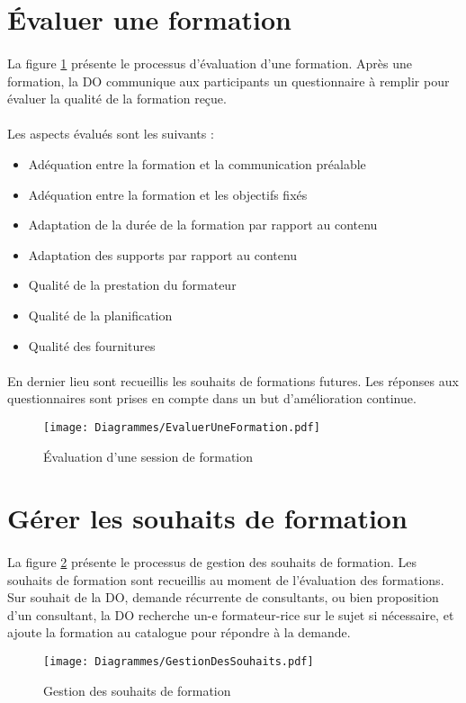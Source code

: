 \section{Évaluer une formation}
\label{sec:eval}
\paragraph{} La figure \ref{evalFormation} présente le processus d'évaluation d'une formation. Après une formation, la DO communique aux participants un questionnaire à remplir pour évaluer la qualité de la formation reçue.
\paragraph{} Les aspects évalués sont les suivants :
\begin{itemize}
	\item Adéquation entre la formation et la communication préalable
	\item Adéquation entre la formation et les objectifs fixés
	\item Adaptation de la durée de la formation par rapport au contenu
	\item Adaptation des supports par rapport au contenu
	\item Qualité de la prestation du formateur
	\item Qualité de la planification
	\item Qualité des fournitures
\end{itemize}

\paragraph{} En dernier lieu sont recueillis les souhaits de formations futures. Les réponses aux questionnaires sont prises en compte dans un but d'amélioration continue.


\begin{figure}[H]
\centering
	\begin{sideways}
		\texttt{[image: Diagrammes/EvaluerUneFormation.pdf]}
	\end{sideways}
	\caption{Évaluation d'une session de formation}
	\label{evalFormation}
\end{figure}


\section{Gérer les souhaits de formation}
\paragraph{} La figure \ref{souhaits} présente le processus de gestion des souhaits de formation. Les souhaits de formation sont recueillis au moment de l'évaluation des formations. Sur souhait de la DO, demande récurrente de consultants, ou bien proposition d'un consultant, la DO recherche un-e formateur-rice sur le sujet si nécessaire, et ajoute la formation au catalogue pour répondre à la demande. 

\begin{figure}[H]
\centering
		\texttt{[image: Diagrammes/GestionDesSouhaits.pdf]}
	\caption{Gestion des souhaits de formation}
	\label{souhaits}
\end{figure}
